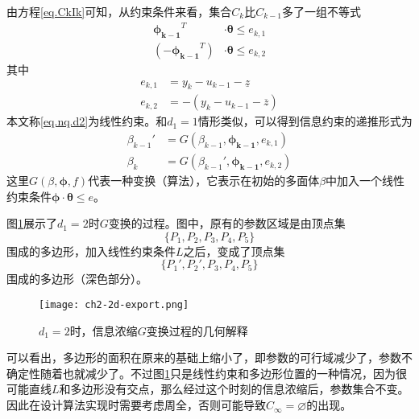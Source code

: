 由方程\eqref{eq.CkIk}可知，从约束条件来看，集合$C_{k}$比$C_{k-1}$多了一组不等式
\begin{equation}%
\label{eq.nq.d2}
\begin{split}%
\bm{\phi_{k-1}}^{T}&\cdot\bm{\theta}\leq e_{k,1}\\
(-\bm{\phi_{k-1}}^{T})&\cdot\bm{\theta}\leq e_{k,2}
\end{split}
\end{equation}
其中
\begin{equation}%
\label{eq.fk}
\begin{split}%
e_{k,1}&=y_{k}-u_{k-1}-\underline{z}\\
e_{k,2}&=-(y_{k}-u_{k-1}-\overline{z})
\end{split}
\end{equation}
本文称\eqref{eq.nq.d2}为线性约束。和$d_{1}=1$情形类似，可以得到信息约束的递推形式为
\begin{equation}%
\begin{split}%
\beta_{k-1}'&=G(\beta_{k-1},\bm{\phi_{k-1}},e_{k,1})\\
\beta_{k}&=G(\beta_{k-1}',\bm{\phi_{k-1}},e_{k,2})
\end{split}
\end{equation}
这里$G(\beta,\bm{\phi},f)$代表一种变换（算法），它表示在初始的多面体$\beta$中加入一个线性约束条件$\bm{\phi}\cdot\bm{\theta}\leq e$。

图\ref{fig.2d.export}展示了$d_{1}=2$时$G$变换的过程。图中，原有的参数区域是由顶点集
\begin{equation}%
\{P_{1},P_{2},P_{3},P_{4},P_{5}\}
\end{equation}
围成的多边形，加入线性约束条件$L$之后，变成了顶点集
\begin{equation}%
\{P_{1}',P_{2}',P_{3},P_{4},P_{5}\}
\end{equation}
围成的多边形（深色部分）。

\begin{figure}
	\centering
	\texttt{[image: ch2-2d-export.png]}\\	 %
	\caption{$d_{1}=2$时，信息浓缩$G$变换过程的几何解释}
	\label{fig.2d.export}
\end{figure}

可以看出，多边形的面积在原来的基础上缩小了，即参数的可行域减少了，参数不确定性随着也就减少了。不过图\ref{fig.2d.export}只是线性约束和多边形位置的一种情况，因为很可能直线$L$和多边形没有交点，那么经过这个时刻的信息浓缩后，参数集合不变。因此在设计算法实现时需要考虑周全，否则可能导致$C_{\infty}=\varnothing$的出现。

